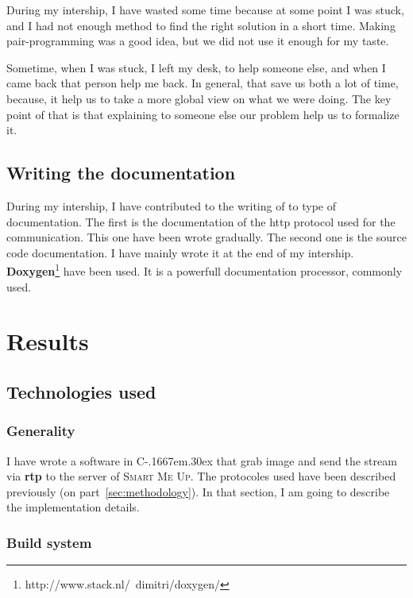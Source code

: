 \documentclass[a4paper,11pt]{custom}
\newcommand{\smu}{\textsc{Smart Me Up}}
\newcommand{\rtp}{\textbf{rtp}\xspace}
\newcommand{\cpp}{%
  C\kern-.1667em\raise.30ex\hbox{\smaller{++}\xspace}%
  \spacefactor1000%
}
\begin{document}
During my intership, I have wasted some time because at some point I was stuck,
and I had not enough method to find the right solution in a short time. Making
pair-programming was a good idea, but we did not use it enough for my taste.

Sometime, when I was stuck, I left my desk, to help someone else, and when I
came back that person help me back. In general, that save us both a lot of time,
because, it help us to take a more global view on what we were doing. The key
point of that is that explaining to someone else our problem help us to
formalize it.

\section{Writing the documentation}

During my intership, I have contributed to the writing of to type of
documentation. The first is the documentation of the http protocol used for the
communication. This one have been wrote gradually. The second one is the source
code documentation. I have mainly wrote it at the end of my intership.
\textbf{Doxygen}\footnote{http://www.stack.nl/~dimitri/doxygen/} have been used.
It is a powerfull documentation processor, commonly used.

\chapter{Results}

\section{Technologies used}

\subsection{Generality}

I have wrote a software in \cpp that grab image and send the stream via \rtp to
the server of \smu. The protocoles used have been described previously (on
part~\ref{sec:methodology}). In that section, I am going to describe the
implementation details.

\subsection{Build system}
\end{document}
